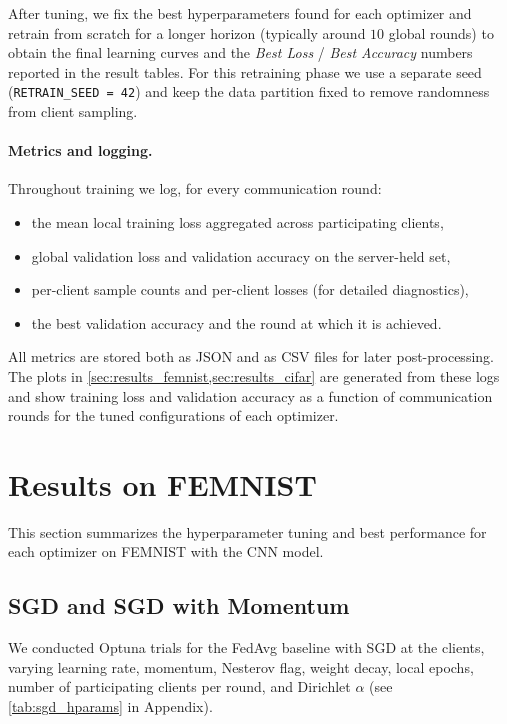 \documentclass[10pt,twocolumn,letterpaper]{article}
\begin{document}
After tuning, we fix the best hyperparameters found for each optimizer
and retrain from scratch for a longer horizon (typically around $10$
global rounds) to obtain the final learning curves and the
\emph{Best Loss} / \emph{Best Accuracy} numbers reported in the result
tables.  For this retraining phase we use a separate seed
(\texttt{RETRAIN\_SEED = 42}) and keep the data partition fixed to
remove randomness from client sampling.

\paragraph{Metrics and logging.}
Throughout training we log, for every communication round:
\begin{itemize}
    \item the mean local training loss aggregated across participating
          clients,
    \item global validation loss and validation accuracy on the
          server-held set,
    \item per-client sample counts and per-client losses (for detailed
          diagnostics),
    \item the best validation accuracy and the round at which it is
          achieved.
\end{itemize}
All metrics are stored both as JSON and as CSV files for later
post-processing.  The plots in \cref{sec:results_femnist,sec:results_cifar}
are generated from these logs and show training loss and validation
accuracy as a function of communication rounds for the tuned
configurations of each optimizer.


    \section{Results on FEMNIST}
    \label{sec:results_femnist}

    This section summarizes the hyperparameter tuning and best performance
    for each optimizer on FEMNIST with the CNN model.

    \subsection{SGD and SGD with Momentum}

    We conducted Optuna trials for the FedAvg baseline with SGD at the clients,
    varying learning rate, momentum, Nesterov flag, weight decay, local
    epochs, number of participating clients per round, and Dirichlet
    $\alpha$ (see \cref{tab:sgd_hparams} in Appendix).
\end{document}
